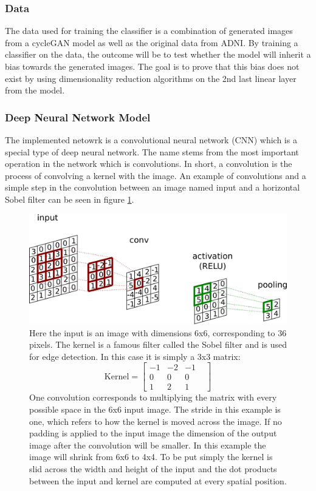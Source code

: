 \documentclass[12pt, fleqn, titlepage]{article}
\begin{document}
\subsubsection{Data}
The data used for training the classifier is a combination of generated images from a cycleGAN model as well as the original data from ADNI. By training a classifier on the data, the outcome will be to test whether the model will inherit a bias towards the generated images. The goal is to prove that this bias does not exist by using dimensionality reduction algorithms on the 2nd last linear layer from the model. 

\subsubsection{Deep Neural Network Model}

	The implemented netowrk is a convolutional neural network (CNN) which is a special type of deep neural network. The name stems from the most important operation in the network which is convolutions. In short, a convolution is the process of convolving a kernel with the image. An example of convolutions and a simple step in the convolution between an image named input and a horizontal Sobel filter can be seen in figure \ref{fig:convolution}.
	
	\begin{figure}[H]
		\centering
		\includegraphics[width=0.65\linewidth, trim={0 0 69cm 0},clip]{imgs/convolution}
		\caption{Here the input is an image with dimensions 6x6, corresponding to 36 pixels. The kernel is a famous filter called the Sobel filter and is used for edge detection. In this case it is simply a 3x3 matrix: 
			\[ \text{Kernel} = \begin{bmatrix}
				-1 & -2 & -1 & \\ 0 & 0 & 0 &  \\
				1 & 2 & 1
			\end{bmatrix}  \] 
		One convolution corresponds to multiplying the matrix with every possible space in the 6x6 input image. The stride in this example is one, which refers to how the kernel is moved across the image. If no padding is applied to the input image the dimension of the output image after the convolution will be smaller. In this example the image will shrink from 6x6 to 4x4. To be put simply the kernel is slid across the width and height of the input and the dot products between the input and kernel are computed at every spatial position. \cite{cnn_paper} }
		\label{fig:convolution}
	\end{figure}
	
\end{document}
